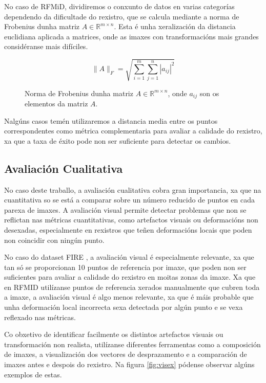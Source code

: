 No caso de RFMiD, dividiremos o conxunto de datos en varias categorías dependendo da dificultade do rexistro, que se calcula mediante a norma de Frobenius dunha matriz $A \in \mathbb{R}^{m \times n}$.
Esta é unha xeralización da distancia euclidiana aplicada a matrices, onde as imaxes con transformacións mais grandes considéranse mais difíciles.

\begin{figure}[tbp]
    \centering
    \[
    \|A\|_F = \sqrt{\sum_{i=1}^{m} \sum_{j=1}^{n} |a_{ij}|^2}
    \]
    \caption{Norma de Frobenius dunha matriz $A \in \mathbb{R}^{m \times n}$, onde $a_{ij}$ son os elementos da matriz $A$.}
    \label{fig:frobenius_norm}
\end{figure}

Nalgúns casos temén utilizaremos a distancia media entre os puntos correspondentes como métrica complementaria para avaliar a calidade do rexistro, xa que a taxa de éxito pode non ser suficiente para detectar os cambios.

\subsection{Avaliación Cualitativa}
\label{subsec:Avaliación Cualitativa}

No caso deste traballo, a avaliación cualitativa cobra gran importancia, xa que na cuantitativa so se está a comparar sobre un número reducido de puntos en cada parexa de imaxes.
A avaliación visual permite detectar problemas que non se reflictan nas métricas cuantitativas, como artefactos visuais ou deformacións non desexadas, 
especialmente en rexistros que teñen deformacións locais que poden non coincidir con ningún punto.

No caso do dataset FIRE \cite{FIRE}, a avaliación visual é especialmente relevante, xa que tan só se proporcionan 10 puntos de referencia por imaxe, que poden non ser suficientes para avaliar a calidade do rexistro en moitas zonas da imaxe.
Xa que en RFMID \cite{RFMiD} utilízanse puntos de referencia xerados manualmente que cubren toda a imaxe, a avaliación visual é algo menos relevante, xa que é máis probable que unha deformación local incorrecta sexa detectada por algún punto e se vexa reflexado nas métricas.

Co obxetivo de identificar facilmente os distintos artefactos visuais ou transformación non realista, utilízanse diferentes ferramentas como a composición de imaxes, a visualización dos vectores de desprazamento e a comparación de imaxes antes e despois do rexistro.
Na figura \ref{fig:visex} pódense observar algúns exemplos de estas.

